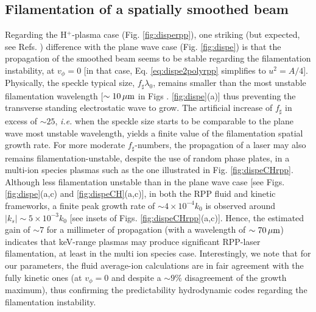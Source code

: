 \documentclass[
 reprint,
 amsmath,amssymb,
 aps,
]{revtex4-1}
\begin{document}
\subsection{Filamentation of a spatially smoothed beam}
Regarding the H$^+$-plasma case (Fig. \ref{fig:disperpp}), one striking (but expected, see Refs. \cite[]{NatPhys_Glenzer,PRL_Sarri_2011}) difference with the plane wave case  (Fig. \ref{fig:dispe}) is that the propagation of the smoothed beam seems to be stable regarding the filamentation instability, at $v_\phi=0$ [in that case, Eq. \eqref{eq:dispe2polyrpp} simplifies to $u^2=A/4$].
Physically, the speckle typical size, $f_\sharp\lambda_0$, remains smaller than the most unstable filamentation wavelength [$\sim 10 \,\rm\mu m$ in Figs . \ref{fig:dispe}(a)] thus preventing the transverse standing electrostatic wave to grow. The artificial increase of $f_\sharp$ in excess of $\sim 25$, \emph{i.e.} when the speckle size starts to be comparable to the plane wave most unstable wavelength,  yields a finite value of the filamentation spatial growth rate. For more moderate  $f_\sharp$-numbers, the propagation of a laser may  also remains filamentation-unstable, despite the use of random phase plates,  in  a multi-ion species plasmas such as the one illustrated in Fig. \ref{fig:dispeCHrpp}. Although less filamentation unstable than in the plane wave case [see Figs. \ref{fig:dispe}(a,c) and \ref{fig:dispeCH}(a,c)], in both the RPP fluid and kinetic frameworks, a finite peak growth rate of $\sim 4\times 10^{-4}k_0 $ is observed around $\vert k_s\vert \sim 5\times 10^{-3}k_0$ [see insets of Figs. \ref{fig:dispeCHrpp}(a,c)].
Hence, the estimated  gain of $\sim 7$   for a millimeter of propagation (with a wavelength of $\sim 70 \,\rm \mu m$) indicates that keV-range plasmas may produce significant RPP-laser filamentation, at least in the multi ion species case.
Interestingly, we note that  for our parameters, the fluid average-ion calculations  are in fair agreement with the fully kinetic ones (at $v_\phi=0$ and despite a $\sim 9\%$ disagreement of the growth maximum), thus confirming the predictability   hydrodynamic codes regarding the filamentation instability. 
\end{document}
